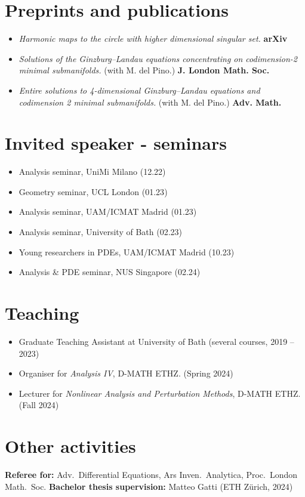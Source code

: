 \documentclass[a4paper,11pt]{article}
\begin{document}
\section*{Preprints and publications}
\noindent
\begin{itemize}
	\item \emph{Harmonic maps to the circle with higher dimensional singular set.} {\bf arXiv}
	\item \emph{Solutions of the Ginzburg--Landau equations concentrating on codimension-2 minimal submanifolds.} (with M. del Pino.) {\bf J. London Math. Soc.}
	\item \emph{Entire solutions to 4-dimensional Ginzburg--Landau equations and codimension 2 minimal submanifolds.} (with M. del Pino.) {\bf Adv. Math.}
\end{itemize}

\vspace{5mm}

\section*{Invited speaker - seminars}
\noindent
\begin{itemize}
	\item Analysis seminar, UniMi Milano ({12.22})
	\item Geometry seminar, UCL London ({01.23})
	\item Analysis seminar,  UAM/ICMAT Madrid (01.23)
	\item Analysis seminar, University of Bath (02.23)
	\item Young researchers in PDEs, UAM/ICMAT Madrid (10.23)
	\item Analysis \& PDE seminar, NUS Singapore (02.24)
\end{itemize}
\vspace{5mm}

\section*{Teaching}
\noindent
\begin{itemize}
	\item Graduate Teaching Assistant at University of Bath (several courses, 2019 -- 2023)
	\item Organiser for \emph{Analysis IV}, D-MATH ETHZ. (Spring 2024)
	\item Lecturer for \emph{Nonlinear Analysis and Perturbation Methods}, D-MATH ETHZ. (Fall 2024)
\end{itemize}
\vspace{5mm}

\section*{Other activities}
\noindent
\textbf{Referee for:} Adv.\ Differential Equations, Ars Inven.\ Analytica, Proc.\ London Math.\ Soc. 
\noindent
\textbf{Bachelor thesis supervision:} Matteo Gatti (ETH Z\"urich, 2024)
\vspace{5mm}
\end{document}
